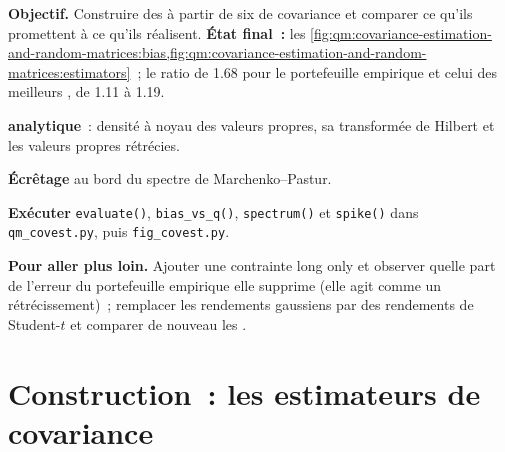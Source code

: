 \begin{tutorial}
\textbf{Objectif.} Construire des  à partir de six  de covariance et comparer ce qu'ils promettent à ce qu'ils réalisent.
\textbf{État final~:} les \cref{fig:qm:covariance-estimation-and-random-matrices:bias,fig:qm:covariance-estimation-and-random-matrices:estimators}~; le ratio de 1.68 pour le portefeuille empirique et
celui des meilleurs , de 1.11 à 1.19.
\begin{tutsteps}
\item \textbf{ analytique}~: densité à noyau des valeurs propres, sa transformée de Hilbert et les valeurs propres rétrécies.
\label{lst:qm:covariance-estimation-and-random-matrices:nl}
\item \textbf{Écrêtage} au bord du spectre de Marchenko--Pastur.
\label{lst:qm:covariance-estimation-and-random-matrices:clip}
\item \textbf{Exécuter} \texttt{evaluate()}, \texttt{bias\_vs\_q()}, \texttt{spectrum()} et \texttt{spike()} dans \texttt{qm\_covest.py}, puis \texttt{fig\_covest.py}.
\end{tutsteps}
\textbf{Pour aller plus loin.} Ajouter une contrainte long only et observer quelle part de l'erreur du portefeuille empirique elle supprime (elle agit comme un rétrécissement)~; remplacer les rendements gaussiens par des
rendements de Student-$t$ et comparer de nouveau les .
\end{tutorial}

\section{Construction~: les estimateurs de covariance}\label{bld:qm:covariance-estimation-and-random-matrices:covest}

